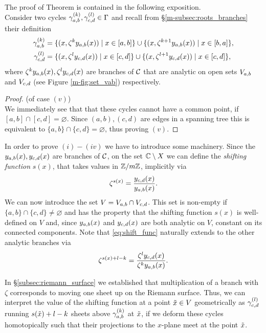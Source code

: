 \documentclass[main.tex]{subfiles}
\begin{document}
 \bigskip
 The proof of Theorem is contained in the following exposition. \\ 
  Consider
  two cycles $\gamma_{a,b}^{(k)},\gamma_{c,d}^{(l)} \in \Gamma$ and
  recall from \S \ref{m-subsec:roots_branches} their definition 
   \begin{align}\label{eq:def_cyabk}
      \gamma_{a,b}^{(k)} & = \{  (x,\zeta^k y_{a,b}(x))  \mid  x \in [a,b]  \} \cup \{  (x,\zeta^{k+1} y_{a,b}(x))  \mid  x \in [b,a]  \}, \\
      \gamma_{c,d}^{(l)} & = \{  (x,\zeta^l y_{c,d}(x))  \mid  x \in [c,d]  \} \cup \{  (x,\zeta^{l+1} y_{c,d}(x))  \mid  x \in [c,d]  \},
   \end{align}
  where $\zeta^ky_{a,b}(x),\zeta^ly_{c,d}(x)$ are branches of $\mathcal{C}$ that are analytic on open sets $V_{a,b}$ and $V_{c,d}$ 
  (see Figure \ref{m-fig:set_vab}) respectively.
  \begin{proof}\let\qed\relax (of case $(v)$) \\
  We immediately see that that these cycles cannot have a common point, if $[a,b] \cap [c,d] = \varnothing$. Since
  $(a,b),(c,d)$ are edges in a spanning tree this is equivalent to $\{a,b\} \cap \{c,d\} = \varnothing$, thus
  proving $(v)$.
  \end{proof}
   In order to prove $(i)-(iv)$ we have to introduce some machinery. Since the $y_{a,b}(x),y_{c,d}(x)$ are branches of $\mathcal{C}$,
   on the set $\mathbb{C} \setminus X$
   we can define the \emph{shifting function}
   $s(x)$, that takes values in $\mathbb{Z}/m\mathbb{Z}$, implicitly via
  \begin{equation}\label{eq:shift_func}
   \zeta^{s(x)} = \frac{y_{c,d}(x)}{y_{a,b}(x)}.
   \end{equation}
  We can now introduce the set $V = V_{a,b} \cap V_{c,d}$. This set is non-empty if  $\{a,b\} \cap \{c,d\} \ne \varnothing$
  and has the property that the shifting function $s(x)$ is well-defined on $V$ and, since $y_{a,b}(x)$ and $y_{c,d}(x)$ are 
  both analytic on $V$, constant on its 
  connected components.
  Note that \eqref{eq:shift_func} naturally extends to the other analytic branches via
  \begin{equation}
   \zeta^{s(x)+l-k} = \frac{\zeta^ly_{c,d}(x)}{\zeta^ky_{a,b}(x)}.
   \end{equation}
  
  In \S \ref{subsec:riemann_surface} we established that multiplication of a branch with $\zeta$ corresponds to moving
  one sheet up on the Riemann surface. Thus, 
  we can interpret the value of the shifting function at a point $\tilde{x} \in V$ geometrically as
  $\gamma_{c,d}^{(l)}$ running $s(\tilde{x})+l-k$ sheets above $\gamma_{a,b}^{(k)}$ at $\tilde{x}$, if we deform these cycles homotopically such that their
  projections to the $x$-plane meet at the point $\tilde{x}$.
  
\end{document}
